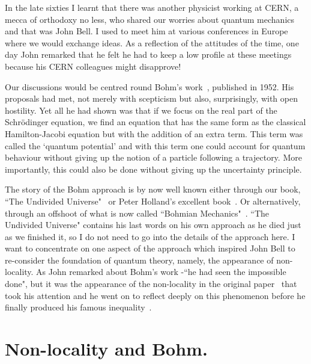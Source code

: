 \documentclass[12pt]{article}
\begin{document}
In the late sixties I learnt that there was another physicist working at CERN, a mecca of orthodoxy no less, who shared our worries about quantum mechanics and that was John Bell.  I used to meet him at various conferences in Europe where we would exchange ideas.  As a reflection of the attitudes of the time, one day John remarked that he felt he had to keep a low profile at these meetings because his CERN colleagues might disapprove!

 Our discussions would be centred round Bohm's work~\cite{db52}, 
 published in 1952.  His proposals had met, not merely with scepticism but also, surprisingly, with open hostility.  Yet all he had  shown was that if we focus on the real part of the Schr\"{o}dinger equation, we find an equation that has the same form as the classical Hamilton-Jacobi equation but with the addition of an extra term.  This term was called the `quantum potential'  and with this term one could account for quantum behaviour without giving up the notion of a particle following a trajectory.  More importantly, this could also be done without giving up the uncertainty principle.
 
The story of the Bohm approach is by now well known either through our book, ``The Undivided Universe"~\cite{dbbh93} or  Peter Holland's excellent book~\cite{ph95}.
Or alternatively, through an offshoot of what is now called ``Bohmian Mechanics"~\cite{ddst09}. 
  ``The Undivided Universe" contains his last words on his own approach as he died just as we finished it, so I do not need to go into the details of the approach here.   I want to concentrate on one aspect of the approach which inspired John Bell to re-consider the foundation of quantum theory, namely, the appearance of non-locality.  As John remarked about Bohm's work -``he had seen the impossible done", but it was the appearance of the non-locality in the original paper~\cite{db52} that took his attention and he went on  to reflect deeply on this phenomenon before he finally produced his famous inequality~\cite{jb64}.


\section{Non-locality and Bohm.}
\end{document}
